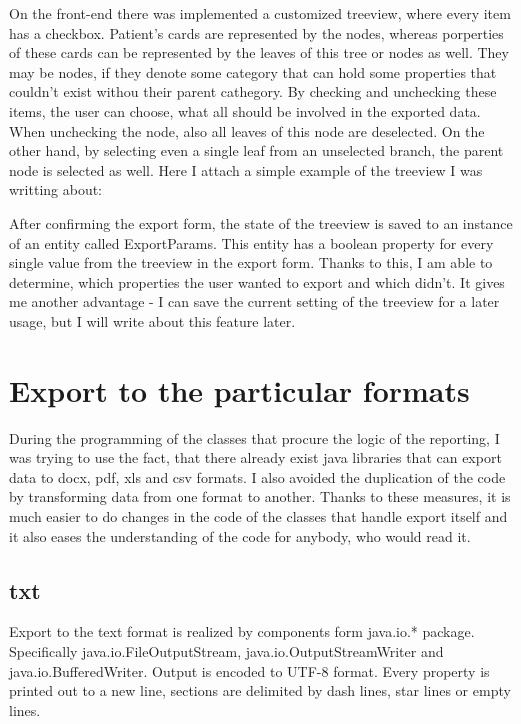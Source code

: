 \documentclass[thesis=B,english]{FITthesis}[2012/10/20]
\begin{document}
On the front-end there was implemented a customized treeview, where every item has a checkbox. Patient's cards are represented by the nodes, whereas porperties of these cards can be represented by the leaves of this tree or nodes as well. They may be nodes, if they denote some category that can hold some properties that couldn't exist withou their parent cathegory. By checking and unchecking these items, the user can choose, what all should be involved in the exported data. When unchecking the node, also all leaves of this node are deselected. On the other hand, by selecting even a single leaf from an unselected branch, the parent node is selected as well.
Here I attach a simple example of the treeview I was writting about:




After confirming the export form, the state of the treeview is saved to an instance of an entity called ExportParams. This entity has a boolean property for every single value from the treeview in the export form. Thanks to this, I am able to determine, which properties the user wanted to export and which didn't. It gives me another advantage - I can save the current setting of the treeview for a later usage, but I will write about this feature later.

\section{Export to the particular formats}
During the  programming of the classes that procure the logic of the reporting, I was trying to use the fact, that there already exist java libraries that can export data to docx, pdf, xls and csv formats. I also avoided the duplication of the code by transforming data from one format to another. Thanks to these measures, it is much easier to do changes in the code of the classes that handle export itself and it also eases the understanding of the code for anybody, who would read it.
\subsection{txt}
Export to the text format is realized by components form java.io.* package. Specifically java.io.FileOutputStream, java.io.OutputStreamWriter and java.io.BufferedWriter. Output is encoded to UTF-8 format. Every property is printed out to a new line, sections are delimited by dash lines, star lines or empty lines.
\end{document}

